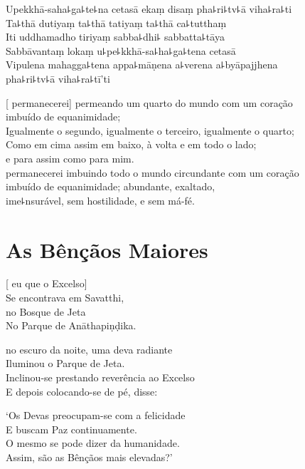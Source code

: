 \clearpage

Upekkhā-saha꜕ga꜕te꜕na cetasā ekaṃ disaṃ pha꜕ri꜕tv꜕ā viha꜕ra꜕ti\\
Ta꜕thā dutiyaṃ ta꜕thā tatiyaṃ ta꜕thā ca꜕tutthaṃ\\
Iti uddhamadho tiriyaṃ sabba꜕dhi꜕ sabbatta꜕tāya\\
Sabbāvantaṃ lokaṃ u꜕pe꜕kkhā-sa꜕ha꜕ga꜕tena cetasā\\
Vipulena mahagga꜕tena appa꜕māṇena a꜕verena a꜕byāpajjhena\\
\vin pha꜕ri꜕tv꜕ā viha꜕ra꜕tī'ti

\clearpage

[ permanecerei] permeando um quarto do mundo com um coração\\
\vin imbuído de equanimidade;\\
Igualmente o segundo, igualmente o terceiro, igualmente o quarto;\\
Como em cima assim em baixo, à volta e em todo o lado;\\
\vin e para  assim como para mim.\\
 permanecerei imbuindo todo o mundo circundante com um coração \\
\vin imbuído de equanimidade; abundante, exaltado,\\
\vin ime꜕nsurável, sem hostilidade, e sem má-fé.

\chapter{As Bênçãos Maiores}


\begin{leader}
\end{leader}

[ eu  que o Excelso]\\
Se encontrava em Savatthi,\\
 no Bosque de Jeta\\
No Parque de Anāthapiṇḍika.

 no escuro da noite, uma deva radiante\\
Iluminou  o Parque de Jeta.\\
Inclinou-se prestando reverência ao Excelso\\
E depois colocando-se de pé, disse:

`Os Devas preocupam-se com a felicidade\\
E buscam Paz continuamente.\\
O mesmo se pode dizer da humanidade.\\
Assim,  são as Bênçãos mais elevadas?'


